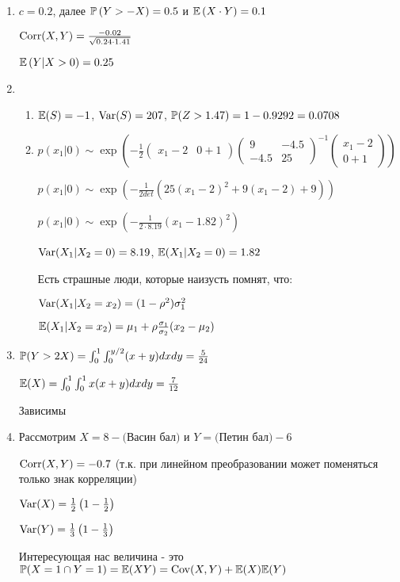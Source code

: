 \begin{enumerate}
\item $c=0.2$, далее $\P\left(Y>-X\right)=0.5$  и $\E\left(X\cdot Y\right)=0.1$

$\Corr(X,Y)=\frac{-0.02}{\sqrt{0.24\cdot 1.41}}$

$\E\left(Y|X>0\right)=0.25$
\item
\begin{enumerate}
\item $\E(S)=-1$, $\Var(S)=207$, $\P(Z>1.47)=1-0.9292=0.0708$
\item $p(x_{1}|0)\sim \exp\left(-\frac{1}{2}\left(\begin{array}{cc} {x_{1}-2} & {0+1} \end{array}\right) \left(\begin{array}{cc} {9} & {-4.5} \\ {-4.5} & {25}
\end{array}\right)^{-1}\left(\begin{array}{c} {x_{1}-2} \\ {0+1}
\end{array}\right)\right)$

$p(x_{1}|0)\sim \exp\left(-\frac{1}{2det}(25(x_{1}-2)^{2}+9(x_{1}-2)+9)\right)$

$p(x_{1}|0)\sim \exp\left(-\frac{1}{2\cdot 8.19}(x_{1}-1.82)^{2}\right)$

$\Var(X_{1}|X_{2}=0)=8.19$, $\E(X_{1}|X_{2}=0)=1.82$

Есть страшные люди, которые наизусть помнят, что:

$\Var(X_{1}|X_{2}=x_{2})=(1-\rho^{2})\sigma_{1}^{2}$

$\E(X_{1}|X_{2}=x_{2})=\mu_{1} + \rho\frac{\sigma_{1}}{\sigma_{2}}(x_{2}-\mu_{2})$
\end{enumerate}
\item $\P(Y>2X)=\int_{0}^{1}\int_{0}^{y/2}(x+y)dxdy=\frac{5}{24}$

$\E(X)=\int_{0}^{1}\int_{0}^{1}x(x+y)dxdy=\frac{7}{12}$

Зависимы
\item Рассмотрим $X=8-($Васин бал$)$ и $Y=($Петин бал$)-6$

$\Corr(X,Y)=-0.7$ (т.к. при линейном преобразовании может поменяться только знак корреляции)

$\Var(X)=\frac{1}{2}\left(1-\frac{1}{2}\right)$

$\Var(Y)=\frac{1}{3}\left(1-\frac{1}{3}\right)$

Интересующая нас величина - это $\P(X=1\cap Y=1)=\E(XY)=\Cov(X,Y)+\E(X)\E(Y)$


\end{enumerate}
